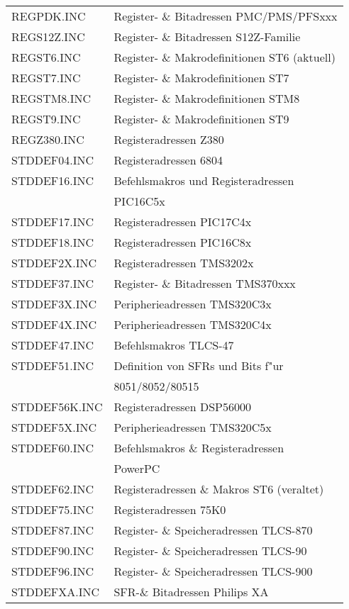 \documentclass[12pt,a4paper,twoside]{report}
\begin{document}
\begin{center}
\begin{longtable}{|l|l|}
REGPDK.INC        & Register- \& Bitadressen PMC/PMS/PFSxxx \\
REGS12Z.INC       & Register- \& Bitadressen S12Z-Familie \\
REGST6.INC        & Register- \& Makrodefinitionen ST6 (aktuell)\\
REGST7.INC        & Register- \& Makrodefinitionen ST7 \\
REGSTM8.INC       & Register- \& Makrodefinitionen STM8 \\
REGST9.INC        & Register- \& Makrodefinitionen ST9 \\
REGZ380.INC       & Registeradressen Z380 \\
STDDEF04.INC      & Registeradressen 6804 \\
STDDEF16.INC      & Befehlsmakros und Registeradressen \\
                  & PIC16C5x \\
STDDEF17.INC      & Registeradressen PIC17C4x \\
STDDEF18.INC      & Registeradressen PIC16C8x \\
STDDEF2X.INC      & Registeradressen TMS3202x \\
STDDEF37.INC      & Register- \& Bitadressen TMS370xxx \\
STDDEF3X.INC      & Peripherieadressen TMS320C3x \\
STDDEF4X.INC      & Peripherieadressen TMS320C4x \\
STDDEF47.INC      & Befehlsmakros TLCS-47 \\
STDDEF51.INC      & Definition von SFRs und Bits f"ur \\
                  & 8051/8052/80515 \\
STDDEF56K.INC     & Registeradressen DSP56000 \\
STDDEF5X.INC      & Peripherieadressen TMS320C5x \\
STDDEF60.INC      & Befehlsmakros \& Registeradressen \\
                  & PowerPC \\
STDDEF62.INC      & Registeradressen \& Makros ST6 (veraltet)\\
STDDEF75.INC      & Registeradressen 75K0 \\
STDDEF87.INC      & Register- \& Speicheradressen TLCS-870 \\
STDDEF90.INC      & Register- \& Speicheradressen TLCS-90 \\
STDDEF96.INC      & Register- \& Speicheradressen TLCS-900 \\
STDDEFXA.INC      & SFR-\& Bitadressen Philips XA \\

\end{longtable}
\end{center}
\end{document}
